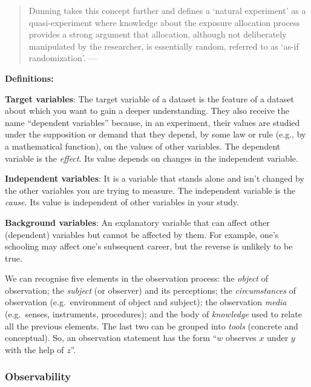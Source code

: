 \documentclass[
]{book}
\begin{document}
\begin{quote}
Dunning takes this concept further and defines a `natural experiment' as a quasi-experiment where knowledge about the exposure allocation process provides a strong argument that allocation, although not deliberately manipulated by the researcher, is essentially random, referred to as `as-if randomization'. --- \citep{de2021conceptualising}
\end{quote}

\begin{tipbox}

\textbf{Definitions:}

\textbf{Target variables}: The target variable of a dataset is the feature of a dataset about which you want to gain a deeper understanding. They also receive the name ``dependent variables'' because, in an experiment, their values are studied under the supposition or demand that they depend, by some law or rule (e.g., by a mathematical function), on the values of other variables. The dependent variable is the \emph{effect}. Its value depends on changes in the independent variable.

\textbf{Independent variables}: It is a variable that stands alone and isn't changed by the other variables you are trying to measure. The independent variable is the \emph{cause}. Its value is independent of other variables in your study.

\textbf{Background variables}: An explanatory variable that can affect other (dependent) variables but cannot be affected by them. For example, one's schooling may affect one's subsequent career, but the reverse is unlikely to be true.

\end{tipbox}

We can recognise five elements in the observation process: the \emph{object} of observation; the \emph{subject} (or observer) and its perceptions; the \emph{circumstances} of observation (e.g.~environment of object and subject); the observation \emph{media} (e.g.~senses, instruments, procedures); and the body of \emph{knowledge} used to relate all the previous elements. The last two can be grouped into \emph{tools} (concrete and conceptual). So, an observation statement has the form ``\(w\) observes \(x\) under \(y\) with the help of \(z\)''. \citep{bunge2017philosophy}

\hypertarget{observability}{%
\subsubsection{Observability}\label{observability}}
\end{document}

